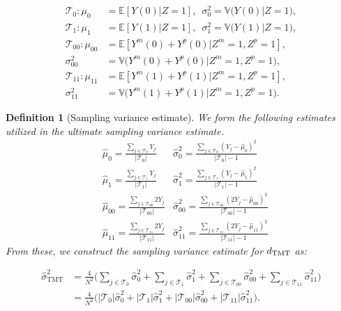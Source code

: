 \documentclass[12pt]{extarticle}
\newtheorem{defin}{Definition}%
\newcommand{\E}{\mathbb{E}}
\newcommand{\tmt}{{\normalfont \text{TMT}}}
\newcommand{\vtmthat}{\hat{\sigma}^2_{\text{TMT}}}
\newcommand{\V}{\mathbb{V}}
\newcommand{\cT}{\mathcal{T}}
\begin{document}
{\allowdisplaybreaks
\begin{align*}
\cT_0: \mu_0 &= \E[Y(0)|Z=1], \,\,\, \sigma^2_0 = \V\big(Y(0)\big|Z=1\big), \\
\cT_1: \mu_1 &= \E[Y(1)|Z=1], \,\,\, \sigma^2_1 = \V\big(Y(1)\big|Z=1\big), \\
\cT_{00}: \mu_{00} &= \E[Y^m(0)+Y^p(0)|Z^m=1,Z^p=1], \\
\sigma^2_{00} &= \V\big(Y^m(0)+Y^p(0)\big|Z^m=1,Z^p=1\big), \\
\cT_{11}: \mu_{11} &= \E[Y^m(1)+Y^p(1)|Z^m=1,Z^p=1], \\
\sigma^2_{11} &= \V\big(Y^m(1)+Y^p(1)\big|Z^m=1,Z^p=1\big).
\end{align*}

\begin{defin}[Sampling variance estimate] \label{def:vdtmt}
We form the following estimates utilized in the ultimate sampling variance estimate.
{\allowdisplaybreaks
\begin{align*}
& \hat{\mu}_0 = \frac{\sum_{j\in \cT_0}Y_j}{|\cT_0|}  & \hat{\sigma}^2_0 = \frac{\sum_{j\in \cT_0}(Y_j-\hat{\mu}_0)^2}{|\cT_0|-1} \nonumber \\
& \hat{\mu}_1 = \frac{\sum_{j\in \cT_1}Y_j}{|\cT_1|}  & \hat{\sigma}^2_1 = \frac{\sum_{j\in \cT_1}(Y_j-\hat{\mu}_1)^2}{|\cT_1|-1} \nonumber \\
& \hat{\mu}_{00} = \frac{\sum_{j\in \cT_{00}}2Y_j}{|\cT_{00}|}  & \hat{\sigma}^2_{00} = \frac{\sum_{j\in \cT_{00}}(2Y_j-\hat{\mu}_{00})^2}{|\cT_{00}|-1} \nonumber \\
& \hat{\mu}_{11} = \frac{\sum_{j\in \cT_{11}}2Y_j}{|\cT_{11}|}  & \hat{\sigma}^2_{11} = \frac{\sum_{j\in \cT_{11}}(2Y_j-\hat{\mu}_{11})^2}{|\cT_{11}|-1}
\end{align*}}
From these, we construct the sampling variance estimate for $d_{\tmt}$ as: 

\begin{equation} \label{eq:vdtmt_hat}
\begin{aligned} 
\vtmthat &= \frac{4}{N^2}\Big(\sum_{j\in \cT_0}\hat{\sigma}^2_0 + \sum_{j\in \cT_1}\hat{\sigma}^2_1 + \sum_{j\in \cT_{00}}\hat{\sigma}^2_{00}+\sum_{j\in \cT_{11}}\hat{\sigma}^2_{11}\Big) \\
&= \frac{4}{N^2}\big(|\cT_0|\hat{\sigma}^2_0+|\cT_1|\hat{\sigma}^2_1+|\cT_{00}|\hat{\sigma}^2_{00}+|\cT_{11}|\hat{\sigma}^2_{11}\big).
\end{aligned} 
\end{equation}
\end{defin}

}
\end{document}
